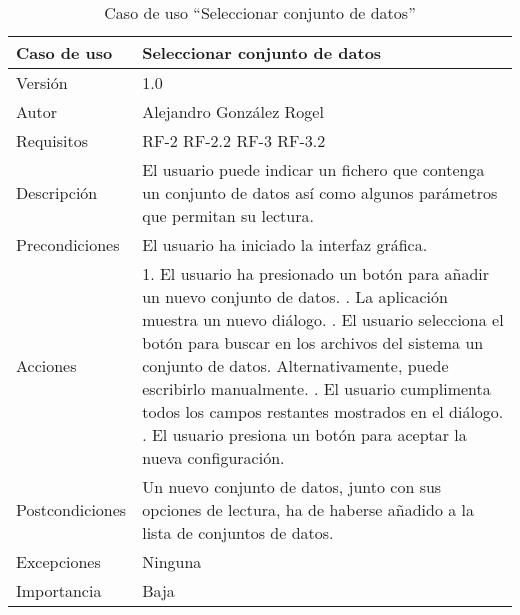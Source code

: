   \begin{table}
  \begin{center}
   \begin{tabular}{|>{} L{3cm} | L{9cm} |}
    \hline
    Caso de uso & Seleccionar conjunto de datos\\
    \hline
    Versión & 1.0 \\
    \hline
    Autor & Alejandro González Rogel \\
    \hline
    Requisitos & RF-2\newline
    				 RF-2.2\newline
    				 RF-3\newline
    				 RF-3.2 \\
    \hline
    Descripción & El usuario puede indicar un fichero que contenga un conjunto de datos así como algunos parámetros que permitan su lectura. \\
    \hline
    Precondiciones & El usuario ha iniciado la interfaz gráfica.\\
    \hline
    Acciones & 1. El usuario ha presionado un botón para añadir un nuevo conjunto de datos. . La aplicación muestra un nuevo diálogo. . El usuario selecciona el botón para buscar en los archivos del sistema un conjunto de datos. Alternativamente, puede escribirlo manualmente. . El usuario cumplimenta todos los campos restantes mostrados en el diálogo. . El usuario presiona un botón para aceptar la nueva configuración. \\
    \hline
    Postcondiciones & Un nuevo conjunto de datos, junto con sus opciones de lectura, ha de haberse añadido a la lista de conjuntos de datos. \\
    \hline
    Excepciones & Ninguna \\
    \hline
    Importancia & Baja \\
    \hline
   \end{tabular}
   \caption{Caso de uso ``Seleccionar conjunto de datos''}
   \label{tabla:casoUso6}
  \end{center}
 \end{table}
 

